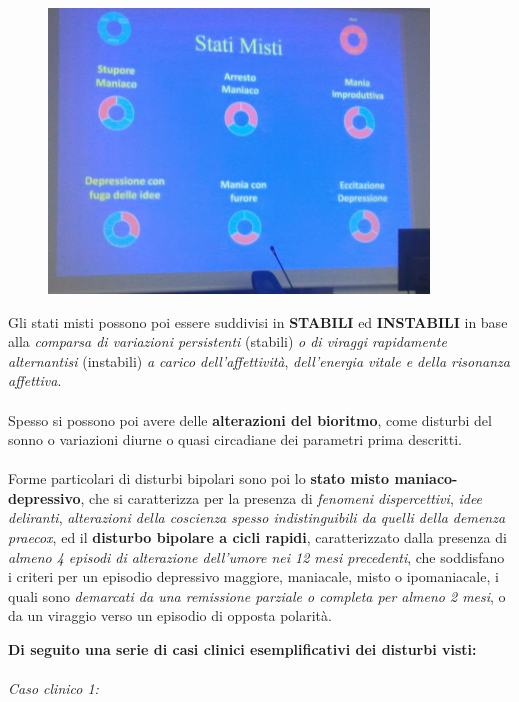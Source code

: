 \begin{itemize}
\begin{figure}[!ht]
\centering
	\includegraphics[width=0.9\textwidth]{02/image11.jpeg}
\end{figure}

Gli stati misti possono poi essere suddivisi in \textbf{STABILI} ed
\textbf{INSTABILI} in base alla \emph{comparsa di variazioni
persistenti} (stabili) \emph{o di viraggi rapidamente alternantisi}
(instabili) \emph{a carico dell'affettività}, \emph{dell'energia vitale
e della risonanza affettiva}.
\\\\
Spesso si possono poi avere delle \textbf{alterazioni del bioritmo},
come disturbi del sonno o variazioni diurne o quasi circadiane dei
parametri prima descritti.
\\\\
Forme particolari di disturbi bipolari sono poi lo \textbf{stato misto
maniaco-depressivo}, che si caratterizza per la presenza di
\emph{fenomeni dispercettivi}, \emph{idee deliranti}, \emph{alterazioni
della coscienza spesso indistinguibili da quelli della demenza praecox},
ed il \textbf{disturbo bipolare a cicli rapidi}, caratterizzato dalla
presenza di \emph{almeno 4 episodi di alterazione dell'umore nei 12 mesi
precedenti}, che soddisfano i criteri per un episodio depressivo
maggiore, maniacale, misto o ipomaniacale, i quali sono \emph{demarcati
da una remissione parziale o completa per almeno 2 mesi}, o da un
viraggio verso un episodio di opposta polarità.
\end{itemize}

\textbf{Di seguito una serie di casi clinici esemplificativi dei
disturbi visti:}
\\\\
\emph{Caso clinico 1:}

